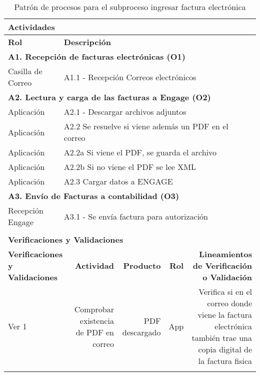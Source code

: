\begin{longtable}{|llrrrrrr|}
	
	\multicolumn{8}{|l|}{\textbf{Actividades}} \\ \hline
    \textbf{Rol} & \multicolumn{7}{|l|}{\textbf{Descripción}} \\ \hline 
    \multicolumn{8}{|l|}{\textbf{A1. Recepción de facturas electrónicas (O1) }} \\ \hline
     Casilla de Correo& \multicolumn{7}{|l|}{A1.1 -  Recepción Correos electrónicos} \\ \hline
   
    \multicolumn{8}{|l|}{\textbf{A2. Lectura y carga de las facturas a Engage (O2)}} \\ \hline
    Aplicación & \multicolumn{7}{|m{12cm}|}{A2.1 - Descargar archivos adjuntos} \\ \hline
    Aplicación & \multicolumn{7}{|l|}{A2.2 Se resuelve si viene además un PDF en el correo} \\ \hline
    Aplicación & \multicolumn{7}{|l|}{A2.2a Si viene el PDF, se guarda el archivo} \\ \hline
    Aplicación & \multicolumn{7}{|m{12cm}|}{A2.2b Si no viene el PDF se lee XML } \\ \hline
    Aplicación & \multicolumn{7}{|m{12cm}|}{A2.3 Cargar datos a ENGAGE} \\ \hline

    \multicolumn{8}{|l|}{\textbf{A3. Envío de Facturas a contabilidad (O3)}} \\ \hline
   	Recepción Engage & \multicolumn{7}{|l|}{A3.1 - Se envía factura para autorización} \\ \hline
    
     & & & & & & & \\ \hline
	\multicolumn{8}{|l|}{\textbf{Verificaciones y Validaciones}} \\ \hline
	\multicolumn{2}{|m{3cm}|}{\textbf{Verificaciones y Validaciones}} & \multicolumn{1}{m{2cm}|}{\textbf{Actividad}} & \multicolumn{1}{m{2,2cm}|}{\textbf{Producto}} & \multicolumn{1}{m{1.5cm}|}{\textbf{Rol}} &\multicolumn{3}{m{4cm}|}{\textbf{Lineamientos de Verificación o Validación}} \\ \hline
	
	\multicolumn{2}{|m{3cm}|}{Ver 1} & \multicolumn{1}{m{2cm}|}{Comprobar existencia de PDF en correo} & \multicolumn{1}{m{2,2cm}|}{PDF descargado} & \multicolumn{1}{m{1.5cm}|}{App} &\multicolumn{3}{m{4cm}|}{Verifica si en el correo donde viene la factura electrónica también trae una copia digital de la factura fisica} \\ \hline
	
    \caption{Patrón de procesos para el subproceso ingresar factura electrónica}
\end{longtable}